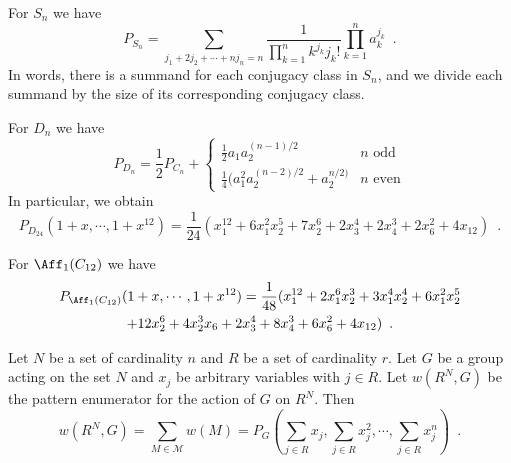 \begin{example}
	For $S_n$ we have
	\begin{equation}
		P_{S_n} = \sum_{j_1 + 2j_2 + \cdots + nj_n = n}
		\frac{1}{\prod_{k = 1}^n k^{j_k} j_k!} \prod_{k = 1}^n a_k^{j_k} \enspace.
	\end{equation}
	In words, there is a summand for each conjugacy class in $S_n$, and we divide each
	summand by the size of its corresponding conjugacy class.
\end{example}

\begin{example}
	For $D_n$ we have
	\begin{equation}
		P_{D_n} = \frac{1}{2} P_{C_n} +
		\begin{cases}
			\frac{1}{2} a_1 a_2^{(n - 1) / 2} & n \text{ odd} \\
			\frac{1}{4} (a_1^2 a_2^{(n - 2) / 2} + a_2^{n / 2)} & n \text{ even}
		\end{cases}
	\end{equation}
	In particular, we obtain
	\begin{equation}
		P_{D_{24}}(1 + x, \cdots, 1 + x^{12}) = \frac{1}{24} ( x_1^{12} + 6 x_1^2 x_2^5 +
		7 x_2^6 + 2 x_3^4 + 2 x_4^3 + 2 x_6^2 + 4 x_{12} ) \enspace.
	\end{equation}
\end{example}

\begin{example}
	\cite[120]{FripertingerLackner2015}
	For $\Aff_1(C_{12})$ we have
	\begin{multline}
		P_{\Aff_1(C_{12})}(1 + x, \cdots, 1 + x^{12}) = \frac{1}{48} (
		x_1^{12} + 2 x_1^6 x_2^3 + 3 x_1^4 x_2^4 + 6 x_1^2 x_2^5 \\ + 12 x_2^6 +
		4 x_2^3 x_6 + 2 x_3^4 + 8 x_4^3 + 6 x_6^2 + 4 x_{12} ) \enspace.
	\end{multline}
\end{example}

\begin{theorem}[Polya]
	\cite[88]{Aigner2007}
	\cite[256]{Tucker1974}
	Let $N$ be a set of cardinality $n$ and $R$ be a set of cardinality $r$. Let $G$ be
	a group acting on the set $N$ and $x_j$ be arbitrary variables with $j \in R$.
	Let $w(R^N, G)$ be the pattern enumerator for the action of $G$ on $R^N$. Then
	\begin{equation}
		w(R^N, G) = \sum_{M \in \mathcal{M}} w(M) = P_G(\sum_{j \in R} x_j,
		\sum_{j \in R} x_j^2, \cdots, \sum_{j \in R} x_j^n) \enspace.
	\end{equation}
\end{theorem}

